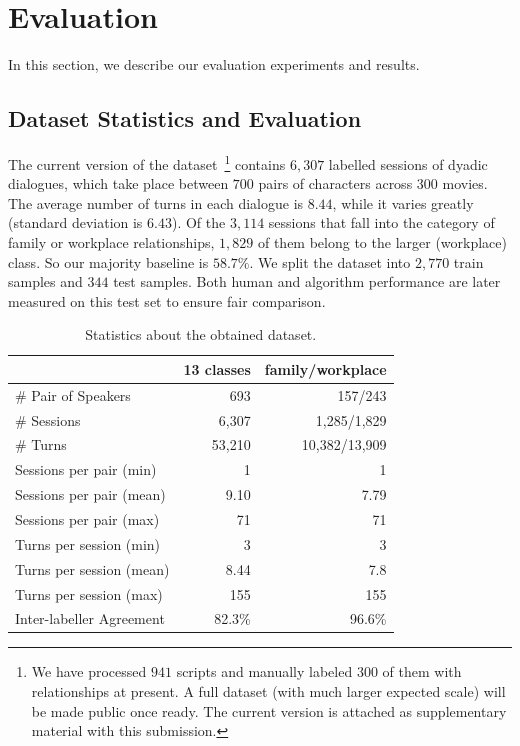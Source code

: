 \section {Evaluation}
\label{sec:eval}
In this section, we describe our evaluation experiments and results.

\subsection{Dataset Statistics and Evaluation}
\label{subsec:human baseline}

The current version of the dataset~\footnote{We have processed $941$ scripts and 
	manually labeled $300$ of them with relationships at present.
 A full dataset (with much larger expected scale) will be made 
public once ready. The current version is attached as supplementary material with this submission.}
contains $6,307$ labelled sessions of dyadic dialogues, 
which take place between $700$ pairs of characters across $300$ movies. 
The average number of turns in each dialogue is $8.44$, 
while it varies greatly (standard deviation is $6.43$). 
Of the $3,114$ sessions that fall into the category of family or 
workplace relationships, $1,829$ of them belong to the larger (workplace) class. 
So our majority baseline is $58.7\%$. We split the dataset into $2,770$ train samples and $344$ test samples. Both human and algorithm performance are later measured on this test set to ensure fair comparison. 
\begin{table}[h!]
	\centering
	\small
	\begin{tabular}{@{}lrr@{}}
		\toprule
		\textbf{}                & 13 classes & family/workplace \\ \midrule
		\# Pair of Speakers      & 693        & 157/243             \\
		\# Sessions              & 6,307       & 1,285/1,829        \\
		\# Turns                 & 53,210     & 10,382/13,909           \\
		Sessions per pair (min)  & 1          & 1                \\
		Sessions per pair (mean) & 9.10       & 7.79             \\
		Sessions per pair (max)  & 71         & 71               \\
		Turns per session (min)  & 3          & 3                \\
		Turns per session (mean) & 8.44       & 7.8              \\
		Turns per session (max)  & 155        & 155              \\\midrule
		Inter-labeller Agreement & 82.3\%     & 96.6\%           \\ \bottomrule
	\end{tabular}
	\caption{Statistics about the obtained dataset.}\label{table:dataset}
\end{table}

